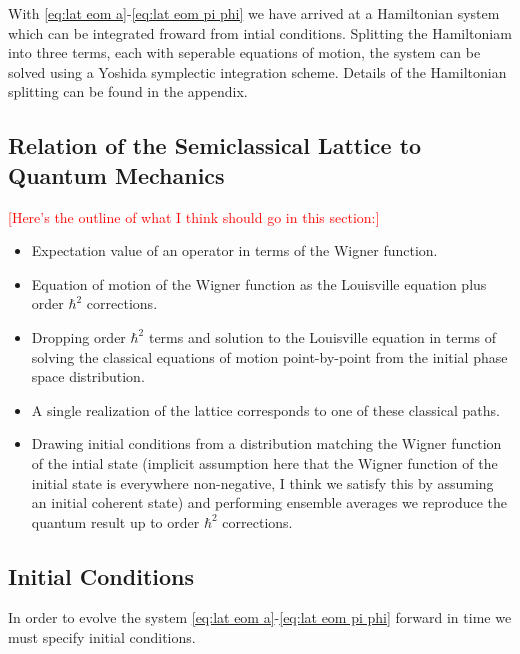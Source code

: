 With \eqref{eq:lat eom a}-\eqref{eq:lat eom pi phi} we have arrived at a Hamiltonian system which can be integrated froward from intial conditions.
Splitting the Hamiltoniam into three terms, each with seperable equations of motion, the system can be solved using a Yoshida symplectic integration scheme.
Details of the Hamiltonian splitting can be found in the appendix.

\subsection{Relation of the Semiclassical Lattice to Quantum Mechanics}
\textcolor{red}{[Here's the outline of what I think should go in this section:]}
\begin{itemize}
  \color{red}
  \item Expectation value of an operator in terms of the Wigner function.
  \item Equation of motion of the Wigner function as the Louisville equation plus order $\hbar^2$ corrections.
  \item Dropping order $\hbar^2$ terms and solution to the Louisville equation in terms of solving the classical equations of motion point-by-point from the initial phase space distribution.
  \item A single realization of the lattice corresponds to one of these classical paths.
  \item Drawing initial conditions from a distribution matching the Wigner function of the intial state (implicit assumption here that the Wigner function of the initial state is everywhere non-negative, I think we satisfy this by assuming an initial coherent state) and performing ensemble averages we reproduce the quantum result up to order $\hbar^2$ corrections.
\end{itemize}
  
\subsection{Initial Conditions}
In order to evolve the system \eqref{eq:lat eom a}-\eqref{eq:lat eom pi phi} forward in time we must specify initial conditions.

